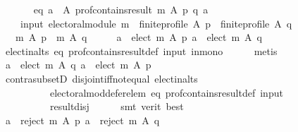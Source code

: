 \begin{isabellebody}
\ \ \isanewline
\ \ \ \ eq{\isacharcolon}{\kern0pt}\ {\isachardoublequoteopen}{\isasymforall}a\ {\isasymin}\ A{\isachardot}{\kern0pt}\ prof{\isacharunderscore}{\kern0pt}contains{\isacharunderscore}{\kern0pt}result\ m\ A\ p\ q\ a{\isachardoublequoteclose}\ \isanewline
\ \ \ \ \isanewline
\ \ \ \ input{\isacharcolon}{\kern0pt}\ {\isachardoublequoteopen}electoral{\isacharunderscore}{\kern0pt}module\ m\ {\isasymand}\ finite{\isacharunderscore}{\kern0pt}profile\ A\ p\ {\isasymand}\ finite{\isacharunderscore}{\kern0pt}profile\ A\ q{\isachardoublequoteclose}\isanewline
\ \ \ {\isachardoublequoteopen}m\ A\ p\ {\isacharequal}{\kern0pt}\ m\ A\ q{\isachardoublequoteclose}\isanewline
%
\isadelimproof
%
\endisadelimproof
%
\isatagproof
{}\isamarkupfalse%
\ {\isacharminus}{\kern0pt}\isanewline
\ \ \isamarkupfalse%
\ {\isachardoublequoteopen}{\isasymforall}a\ {\isasymin}\ elect\ m\ A\ p{\isachardot}{\kern0pt}\ a\ {\isasymin}\ elect\ m\ A\ q{\isachardoublequoteclose}\isanewline
\ \ \ \ \isamarkupfalse%
\ elect{\isacharunderscore}{\kern0pt}in{\isacharunderscore}{\kern0pt}alts\ eq\ prof{\isacharunderscore}{\kern0pt}contains{\isacharunderscore}{\kern0pt}result{\isacharunderscore}{\kern0pt}def\ input\ in{\isacharunderscore}{\kern0pt}mono\isanewline
\ \ \ \ \isamarkupfalse%
\ metis\isanewline
\ \ \isamarkupfalse%
\ \isamarkupfalse%
\ {\isachardoublequoteopen}{\isasymforall}a\ {\isasymin}\ elect\ m\ A\ q{\isachardot}{\kern0pt}\ a\ {\isasymin}\ elect\ m\ A\ p{\isachardoublequoteclose}\isanewline
\ \ \ \ \isamarkupfalse%
\ contra{\isacharunderscore}{\kern0pt}subsetD\ disjoint{\isacharunderscore}{\kern0pt}iff{\isacharunderscore}{\kern0pt}not{\isacharunderscore}{\kern0pt}equal\ elect{\isacharunderscore}{\kern0pt}in{\isacharunderscore}{\kern0pt}alts\isanewline
\ \ \ \ \ \ \ \ \ \ electoral{\isacharunderscore}{\kern0pt}mod{\isacharunderscore}{\kern0pt}defer{\isacharunderscore}{\kern0pt}elem\ eq\ prof{\isacharunderscore}{\kern0pt}contains{\isacharunderscore}{\kern0pt}result{\isacharunderscore}{\kern0pt}def\ input\isanewline
\ \ \ \ \ \ \ \ \ \ result{\isacharunderscore}{\kern0pt}disj\isanewline
\ \ \ \ \isamarkupfalse%
\ {\isacharparenleft}{\kern0pt}smt\ {\isacharparenleft}{\kern0pt}verit{\isacharcomma}{\kern0pt}\ best{\isacharparenright}{\kern0pt}{\isacharparenright}{\kern0pt}\isanewline
\ \ \isamarkupfalse%
\ \isamarkupfalse%
\ {\isachardoublequoteopen}{\isasymforall}a\ {\isasymin}\ reject\ m\ A\ p{\isachardot}{\kern0pt}\ a\ {\isasymin}\ reject\ m\ A\ q{\isachardoublequoteclose}\isanewline

\end{isabellebody}
